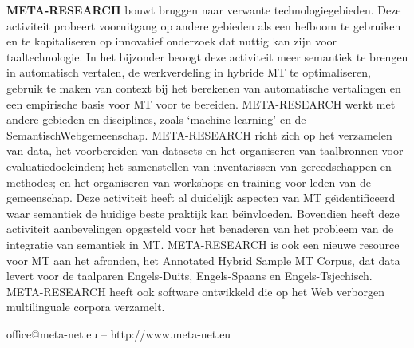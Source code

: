 \documentclass[]{../../metanetpaper}
\begin{document}
\begin{multicols}{2}
    \textbf{META-RESEARCH} bouwt bruggen naar verwante technologiegebieden. Deze activiteit probeert vooruitgang op andere gebieden als een hefboom te gebruiken en te kapitaliseren op innovatief onderzoek dat nuttig kan zijn voor taaltechnologie. In het bijzonder beoogt deze activiteit meer semantiek te brengen in automatisch vertalen, de werkverdeling in hybride MT te optimaliseren, gebruik te maken van context bij het berekenen van automatische vertalingen en een empirische basis voor MT voor te bereiden. META-RESEARCH werkt met andere gebieden en disciplines, zoals `machine learning' en de SemantischWebgemeenschap. META-RESEARCH richt zich op het verzamelen van data, het voorbereiden van datasets en het organiseren van taalbronnen voor evaluatiedoeleinden; het samenstellen van inventarissen van gereedschappen en methodes; en het organiseren van workshops en training voor leden van de gemeenschap. Deze activiteit heeft al duidelijk aspecten van MT ge{\"\i}dentificeerd waar semantiek de huidige beste praktijk kan be{\"\i}nvloeden. Bovendien heeft deze activiteit aanbevelingen opgesteld voor het benaderen van het probleem van de integratie van semantiek in MT. META-RESEARCH is ook een nieuwe resource voor MT aan het afronden, het Annotated Hybrid Sample MT Corpus, dat data levert voor de taalparen Engels-Duits, Engels-Spaans en Engels-Tsjechisch. META-RESEARCH heeft ook software ontwikkeld die op het Web verborgen multilinguale corpora verzamelt.

\end{multicols}

\vfill
\centerline{office@meta-net.eu -- http://www.meta-net.eu}


\setcounter{section}{0}
\setcounter{figure}{0}

\cleardoublepage



\end{document}
